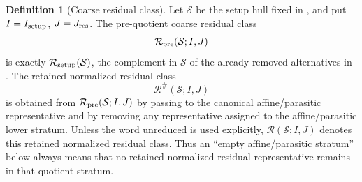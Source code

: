 \documentclass[11pt]{amsart}
\numberwithin{equation}{section}
\theoremstyle{plain}
\theoremstyle{definition}
\newtheorem{definition}[definition]{Definition}
\theoremstyle{remark}
\newcommand{\calS}{\mathcal S}
\newcommand{\calR}{\mathcal R}
\begin{document}
\begin{definition}[Coarse residual class]
\label{def:coarse-residual}
Let \(\calS\) be the setup hull fixed in
, and put
\(I=I_{\rm setup}\), \(J=J_{\rm res}\).  The pre-quotient coarse residual class
\[
   \calR_{\rm pre}(\calS;I,J)
\]
is exactly \(\calR_{\rm setup}(\calS)\), the complement in \(\calS\) of the
already removed alternatives in .  The retained
normalized residual class
\[
   \calR^\#(\calS;I,J)
\]
is obtained from \(\calR_{\rm pre}(\calS;I,J)\) by passing to the canonical
affine/parasitic representative and by removing any representative assigned to
the affine/parasitic lower stratum.  Unless the word unreduced is used explicitly,
\(\calR(\calS;I,J)\) denotes this retained normalized residual class.  Thus an
``empty affine/parasitic stratum'' below always means that no retained
normalized residual representative remains in that quotient stratum.
\end{definition}
\end{document}
